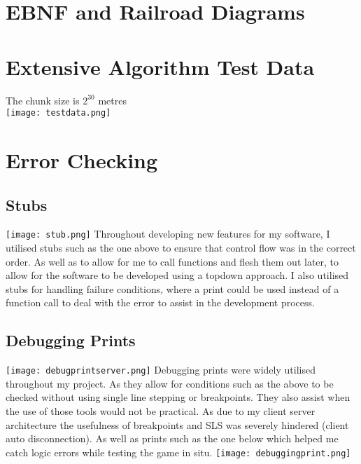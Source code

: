 \documentclass[12pt, DIV=calc]{scrartcl}
\begin{document}
\clearpage
\section{EBNF and Railroad Diagrams}






\clearpage
\section{Extensive Algorithm Test Data}
The chunk size is $2^{30}$ metres \\
\texttt{[image: testdata.png]}




\clearpage
\section{Error Checking}
\subsection{Stubs}
\texttt{[image: stub.png]}
Throughout developing new features for my software, I utilised stubs such as the one above to ensure that control flow was in the correct order. As well as to allow for me to call functions and flesh them out later, to allow for the software to be developed using a top\-down approach. I also utilised stubs for handling failure conditions, where a print could be used instead of a function call to deal with the error to assist in the development process.

\subsection{Debugging Prints}
\texttt{[image: debugprintserver.png]}
Debugging prints were widely utilised throughout my project. As they allow for conditions such as the above to be checked without using single line stepping or breakpoints. They also assist when the use of those tools would not be practical. As due to my client server architecture the usefulness of breakpoints and SLS was severely hindered (client auto disconnection). As well as prints such as the one below which helped me catch logic errors while testing the game in situ.
\texttt{[image: debuggingprint.png]}
\end{document}
